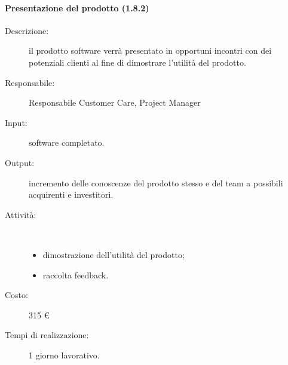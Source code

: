 \paragraph{Presentazione del prodotto (1.8.2)}
\begin{description}
\item[Descrizione:] il prodotto software verr\`{a} presentato in opportuni incontri con dei potenziali clienti al fine di dimostrare l'utilit\`{a} del prodotto.
\item[Responsabile:] Responsabile Customer Care, Project Manager
\item[Input:] software completato.
\item[Output:] incremento delle conoscenze del prodotto stesso e del team a possibili acquirenti e investitori. 
\item[Attività:]\mbox{}\\[-1.5\baselineskip]
	\begin{itemize}
	\item dimostrazione dell'utilit\`{a} del prodotto;
	\item raccolta feedback.
	\end{itemize}
\item[Costo:] 315 \euro{}
\item[Tempi di realizzazione:] 1 giorno lavorativo.
\end{description}
